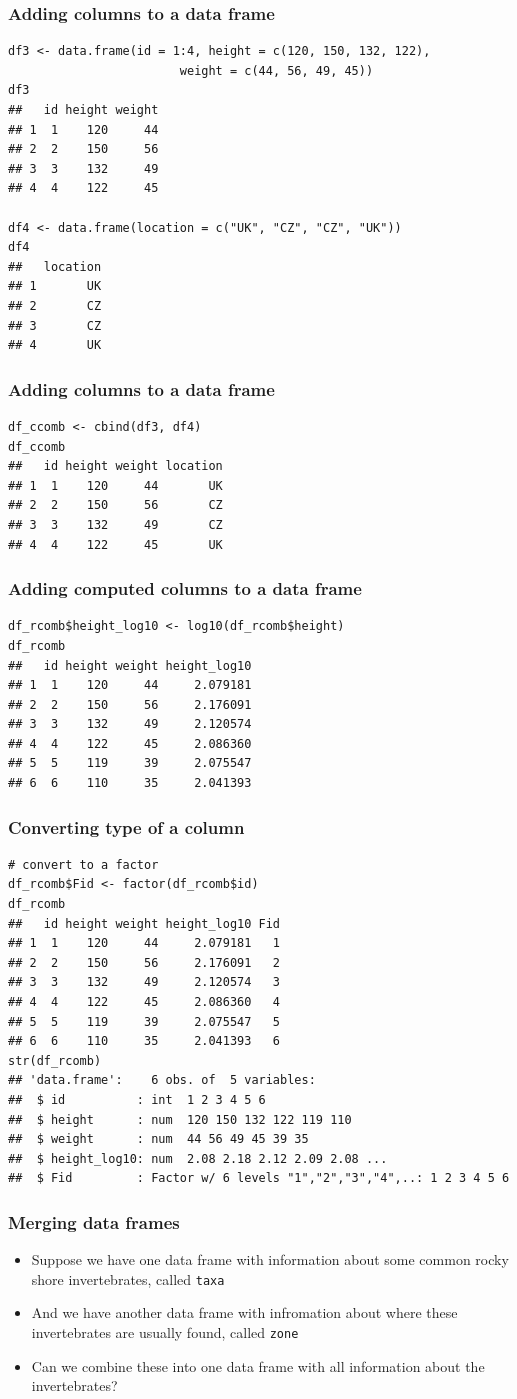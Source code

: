 \documentclass{beamer}
\newcommand{\lsting}[1]{\begin{lstlisting}[basicstyle=#1]}
\newcommand{\bi}{\begin{itemize}}
\newcommand{\li}{\item}
\newcommand{\ei}{\end{itemize}}
\newcommand{\bfr}[1]{\begin{frame}[fragile]\frametitle{{ #1 }}}
\begin{document}
\bfr{Adding columns to a data frame}
\lsting{\scriptsize}
df3 <- data.frame(id = 1:4, height = c(120, 150, 132, 122),
                        weight = c(44, 56, 49, 45))
df3
##   id height weight
## 1  1    120     44
## 2  2    150     56
## 3  3    132     49
## 4  4    122     45

df4 <- data.frame(location = c("UK", "CZ", "CZ", "UK"))
df4
##   location
## 1       UK
## 2       CZ
## 3       CZ
## 4       UK
\end{lstlisting}
\end{frame}


\bfr{Adding columns to a data frame}
\lsting{\scriptsize}
df_ccomb <- cbind(df3, df4)
df_ccomb
##   id height weight location
## 1  1    120     44       UK
## 2  2    150     56       CZ
## 3  3    132     49       CZ
## 4  4    122     45       UK
\end{lstlisting}
\end{frame}

\bfr{Adding computed columns to a data frame}
\lsting{\scriptsize}
df_rcomb$height_log10 <- log10(df_rcomb$height)
df_rcomb
##   id height weight height_log10
## 1  1    120     44     2.079181
## 2  2    150     56     2.176091
## 3  3    132     49     2.120574
## 4  4    122     45     2.086360
## 5  5    119     39     2.075547
## 6  6    110     35     2.041393
\end{lstlisting}
\end{frame}

\bfr{Converting type of a column}
\lsting{\tiny}
# convert to a factor 
df_rcomb$Fid <- factor(df_rcomb$id)
df_rcomb
##   id height weight height_log10 Fid
## 1  1    120     44     2.079181   1
## 2  2    150     56     2.176091   2
## 3  3    132     49     2.120574   3
## 4  4    122     45     2.086360   4
## 5  5    119     39     2.075547   5
## 6  6    110     35     2.041393   6
str(df_rcomb)
## 'data.frame':    6 obs. of  5 variables:
##  $ id          : int  1 2 3 4 5 6
##  $ height      : num  120 150 132 122 119 110
##  $ weight      : num  44 56 49 45 39 35
##  $ height_log10: num  2.08 2.18 2.12 2.09 2.08 ...
##  $ Fid         : Factor w/ 6 levels "1","2","3","4",..: 1 2 3 4 5 6
\end{lstlisting}
\end{frame}


\bfr{Merging data frames}
\bi
\li Suppose we have one data frame with information about some
common rocky shore invertebrates, called \verb|taxa|
\li And we have another data frame with infromation about where these invertebrates are usually found,
called \verb|zone|
\li Can we combine these into one data frame with all information about the invertebrates?
\ei
\end{frame}
\end{document}
